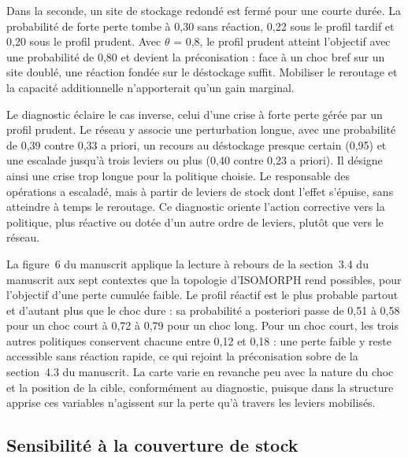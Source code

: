 Dans la seconde, un site de stockage redondé est fermé pour une courte durée. La probabilité de forte perte tombe à 0,30 sans réaction, 0,22 sous le profil tardif et 0,20 sous le profil prudent. Avec $\theta$ = 0,8, le profil prudent atteint l'objectif avec une probabilité de 0,80 et devient la préconisation : face à un choc bref sur un site doublé, une réaction fondée sur le déstockage suffit. Mobiliser le reroutage et la capacité additionnelle n'apporterait qu'un gain marginal.

\begin{center}

\label{fig:d7}
\end{center}

Le diagnostic éclaire le cas inverse, celui d'une crise à forte perte gérée par un profil prudent. Le réseau y associe une perturbation longue, avec une probabilité de 0,39 contre 0,33 a priori, un recours au déstockage presque certain (0,95) et une escalade jusqu'à trois leviers ou plus (0,40 contre 0,23 a priori). Il désigne ainsi une crise trop longue pour la politique choisie. Le responsable des opérations a escaladé, mais à partir de leviers de stock dont l'effet s'épuise, sans atteindre à temps le reroutage. Ce diagnostic oriente l'action corrective vers la politique, plus réactive ou dotée d'un autre ordre de leviers, plutôt que vers le réseau.

La figure~6 du manuscrit applique la lecture à rebours de la section~3.4 du manuscrit aux sept contextes que la topologie d'ISOMORPH rend possibles, pour l'objectif d'une perte cumulée faible. Le profil réactif est le plus probable partout et d'autant plus que le choc dure : sa probabilité a posteriori passe de 0,51 à 0,58 pour un choc court à 0,72 à 0,79 pour un choc long. Pour un choc court, les trois autres politiques conservent chacune entre 0,12 et 0,18 : une perte faible y reste accessible sans réaction rapide, ce qui rejoint la préconisation sobre de la section~4.3 du manuscrit. La carte varie en revanche peu avec la nature du choc et la position de la cible, conformément au diagnostic, puisque dans la structure apprise ces variables n'agissent sur la perte qu'à travers les leviers mobilisés.

\subsection{Sensibilité à la couverture de stock}
\label{sec:S6.4}

